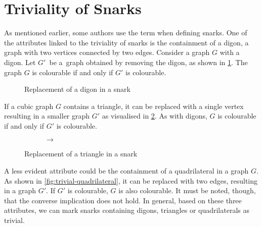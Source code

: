 \section{Triviality of Snarks}\label{sec:snarks-triviality}

As mentioned earlier, some authors use the term  when defining snarks. One of the attributes linked to the triviality of snarks is the containment of a digon, a graph with two vertices connected by two edges. Consider a graph $G$ with a digon. Let $G'$~be a~graph obtained by removing the digon, as shown in \cref{fig:trivial-digon}. The graph $G$ is colourable if and only if $G'$ is colourable.

\begin{figure}
	\centering
	
	\caption{Replacement of a digon in a snark}
	\label{fig:trivial-digon}
\end{figure}

 If a cubic graph $G$ contains a triangle, it can be replaced with a single vertex resulting in a smaller graph $G'$ as visualised in \cref{fig:trivial-triangle}. As with digons, $G$ is colourable if and only if $G'$ is colourable.
 
 \begin{figure}
 	\centering
 	\begin{subfigure}{0.4\textwidth}
 		\raggedleft
 		
 	\end{subfigure}
 	\hfill
 	\begin{subfigure}{0.1\textwidth}
 		\centering
 		$\rightarrow$
 		\newline\newline
 	\end{subfigure}
 	\hfill
 	\begin{subfigure}{0.4\textwidth}
 		\raggedright
 		
 	\end{subfigure}
 	\caption{Replacement of a triangle in a snark}
 	\label{fig:trivial-triangle}
 \end{figure}

A less evident attribute could be the containment of a quadrilateral in a graph $G$. As shown in \cref{fig:trivial-quadrilateral}, it can be replaced with two edges, resulting in a graph $G'$. If $G'$ is colourable, $G$ is also colourable. It must be noted, though, that the converse implication does not hold. In general, based on these three attributes, we can mark snarks containing digons, triangles or quadrilaterals as trivial.

